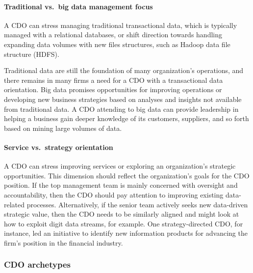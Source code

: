 \documentclass[
]{article}
\begin{document}
\hypertarget{traditional-vs.-big-data-management-focus}{%
\paragraph*{Traditional vs.~big data management focus}\label{traditional-vs.-big-data-management-focus}}

A CDO can stress managing traditional transactional data, which is
typically managed with a relational databases, or shift direction
towards handling expanding data volumes with new files structures, such
as Hadoop data file structure (HDFS).

Traditional data are still the foundation of many organization's
operations, and there remains in many firms a need for a CDO with a
transactional data orientation. Big data promises opportunities for
improving operations or developing new business strategies based on
analyses and insights not available from traditional data. A CDO
attending to big data can provide leadership in helping a business gain
deeper knowledge of its customers, suppliers, and so forth based on
mining large volumes of data.

\hypertarget{service-vs.-strategy-orientation}{%
\paragraph*{Service vs.~strategy orientation}\label{service-vs.-strategy-orientation}}

A CDO can stress improving services or exploring an organization's
strategic opportunities. This dimension should reflect the
organization's goals for the CDO position. If the top management team is
mainly concerned with oversight and accountability, then the CDO should
pay attention to improving existing data-related processes.
Alternatively, if the senior team actively seeks new data-driven
strategic value, then the CDO needs to be similarly aligned and might
look at how to exploit digit data streams, for example. One
strategy-directed CDO, for instance, led an initiative to identify new
information products for advancing the firm's position in the financial
industry.

\hypertarget{cdo-archetypes}{%
\subsubsection*{CDO archetypes}\label{cdo-archetypes}}
\end{document}
